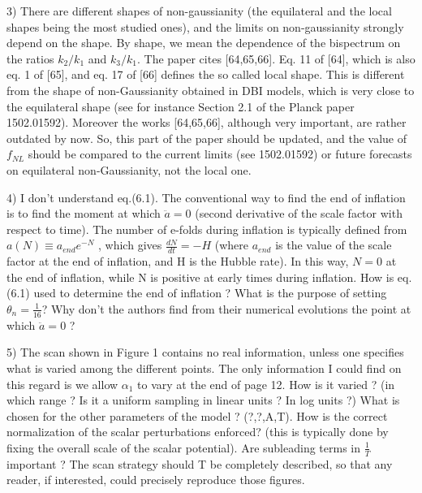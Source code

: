 \documentclass[a4paper,11pt]{article}
\begin{document}
3) There are different shapes of non-gaussianity (the equilateral and the local shapes being the most studied ones), and the limits on non-gaussianity strongly depend on the shape. By shape, we mean the dependence of the bispectrum on the ratios $k_2/k_1$ and 
$k_3/k_1$. The paper cites [64,65,66]. Eq. 11 of [64], which is also eq. 1 of [65], and eq. 17 of [66] defines the so called local shape. This is different from the shape of non-Gaussianity obtained in DBI models, which is very close to the equilateral shape (see for instance Section 2.1 of the Planck paper 1502.01592). Moreover the works [64,65,66], although very important, are rather outdated by now. So, this part of the paper should be updated, and the value of $f_{NL}$ should be compared to the current limits (see 1502.01592) or future forecasts on equilateral non-Gaussianity, not the local one.


4) I don't understand eq.(6.1). The conventional way to find the end
of inflation is to find the moment at which $\ddot a = 0$ (second derivative of the
scale factor with respect to time). The number of e-folds during inflation is
typically defined from $a(N ) \equiv a_{end} e^{-N}$ , which gives  $\frac{dN}{dt} = -H$ (where $a_{end}$ 
is the value of the scale factor at the end of inflation, and H is the Hubble
rate). In this way, $N = 0$ at the end of inflation, while N is positive at
early times during inflation. How is eq. (6.1) used to determine the end of
inflation ?  What is the purpose of setting $\theta_n = \frac{1}{16}$?  Why don't the authors 
find from their numerical evolutions the point at which $\ddot a = 0$ ?\\



5) The scan shown in Figure 1 contains no real information, unless one
specifies what is varied among the different points. The only information I
could find on this regard is we allow $\alpha_1$ to vary at the end of page 12.
How is it varied ? (in which range ? Is it a uniform sampling in linear units
? In log units ?) What is chosen for the other parameters of the model
? (?,?,A,T). How is the correct normalization of the scalar perturbations
enforced? (this is typically done by fixing the overall scale of the scalar
potential). Are subleading terms in $\frac{1}{T}$  important ? The scan strategy should T
be completely described, so that any reader, if interested, could precisely reproduce those figures.\\
\end{document}
